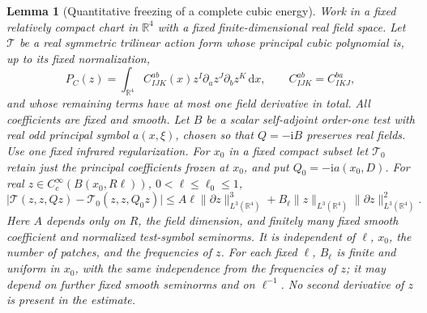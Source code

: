 \documentclass[11pt,a4paper]{article}
\numberwithin{equation}{section}
\newcommand{\dd}{\mathrm d}
\newcommand{\R}{\mathbb R}
\newcommand{\ii}{\mathrm{i}}
\newtheorem{lemma}[theorem]{Lemma}
\theoremstyle{definition}
\begin{document}
\begin{lemma}[Quantitative freezing of a complete cubic energy]
\label{lem:freezing}
Work in a fixed relatively compact chart in $\mathbb R^4$ with a fixed
finite-dimensional real field space. Let $\mathcal T$ be a real symmetric
trilinear action form whose principal cubic polynomial is, up to its
fixed normalization,
\begin{equation}\label{eq:freezing-statement-1}
 P_C(z)=\int_{\R^4} C_{IJK}^{ab}(x)z^I\partial_a z^J\partial_b z^K\,\dd x,
 \qquad C_{IJK}^{ab}=C_{IKJ}^{ba},
\end{equation}
and whose remaining terms have at most one field derivative in total.
All coefficients are fixed and smooth. Let $B$ be a scalar self-adjoint
order-one test with real odd principal symbol $a(x,\xi)$, chosen so that
$Q=-\ii B$ preserves real fields. Use one fixed infrared regularization.
For $x_0$ in a fixed compact subset let $\mathcal T_0$ retain just the
principal coefficients frozen at $x_0$, and put $Q_0=-\ii a(x_0,D)$.
For real $z\in C_c^\infty(B(x_0,R\ell))$, $0<\ell\leq\ell_0\leq1$,
\begin{equation}\label{eq:freezing-quantitative}
 \big|\mathcal T(z,z,Qz)-\mathcal T_0(z,z,Q_0z)\big|
 \leq A\ell\|\partial z\|_{L^3(\R^4)}^3+B_\ell\|z\|_{L^3(\R^4)}\|\partial z\|_{L^3(\R^4)}^2.
\end{equation}
Here $A$ depends only on $R$, the field dimension, and finitely many
fixed smooth coefficient and normalized test-symbol seminorms.
It is independent of $\ell$, $x_0$, the number of patches, and the
frequencies of $z$. For each fixed $\ell$, $B_\ell$ is finite and
uniform in $x_0$, with the same independence from the frequencies of
$z$; it may depend on further fixed smooth seminorms and on $\ell^{-1}$.
No second derivative of $z$ is present in the estimate.
\end{lemma}
\end{document}

